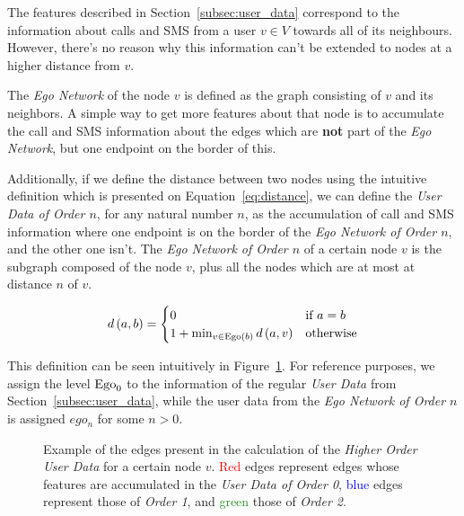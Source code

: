 The features described in Section~\ref{subsec:user_data} correspond to the information about calls and SMS from a user $v \in V$ towards all of its neighbours. However, there's no reason why this information can't be extended to nodes at a higher distance from $v$.

The \emph{Ego Network} of the node $v$ is defined as the graph consisting of $v$ and its neighbors. A simple way to get more features about that node is to accumulate the call and SMS information about the edges which are \textbf{not} part of the \emph{Ego Network}, but one endpoint on the border of this.

Additionally, if we define the distance between two nodes using the intuitive definition which is presented on Equation~\ref{eq:distance}, we can define the \emph{User Data of Order $n$}, for any natural number $n$, as the accumulation of call and SMS information where one endpoint is on the border of the \emph{Ego Network of Order $n$}, and the other one isn't. The \emph{Ego Network of Order $n$} of a certain node $v$ is the subgraph composed of the node $v$, plus all the nodes which are at most at distance $n$ of $v$.

\begin{equation}
d \left( a, b \right) =
\begin{cases}
	0 & \text{if } a = b \\
	1 + \min_{v \in \operatorname{Ego} \left(b \right)} d \left( a, v \right) & \text{otherwise}
\end{cases}
\label{eq:distance}
\end{equation}

This definition can be seen intuitively in Figure~\ref{fig:higherorderuserdata}. For reference purposes, we assign the level $\operatorname{Ego}_0$ to the information of the regular \emph{User Data} from Section~\ref{subsec:user_data}, while the user data from the \emph{Ego Network of Order $n$} is assigned $ego_n$ for some $n > 0$\footnotemark{}.


\begin{figure}
\centering
\framebox[\columnwidth]{%
	
}
\caption{Example of the edges present in the calculation of the \emph{Higher Order User Data} for a certain node $v$. \textcolor{red}{Red} edges represent edges whose features are accumulated in the \emph{User Data of Order 0}, \textcolor{blue}{blue} edges represent those of \emph{Order 1}, and \textcolor{ForestGreen}{green} those of \emph{Order 2}.}
\label{fig:higherorderuserdata}
\end{figure}

